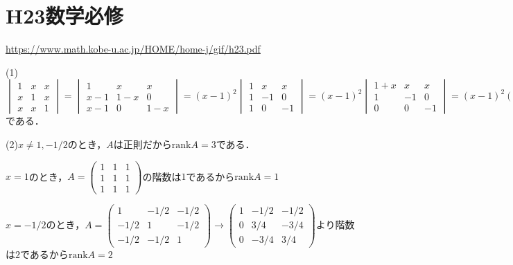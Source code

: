 \documentclass[
		book,
		head_space=20mm,
		foot_space=20mm,
		gutter=10mm,
		line_length=190mm
]{jlreq}
\begin{document}
\section{H23数学必修}
\url{https://www.math.kobe-u.ac.jp/HOME/home-j/gif/h23.pdf}

(1)$\begin{vmatrix}
    1 & x & x \\
    x & 1 & x \\
    x & x & 1
\end{vmatrix}=\begin{vmatrix}
    1 & x & x \\
    x-1 & 1-x & 0 \\
    x-1 & 0 & 1-x
\end{vmatrix}=(x-1)^2\begin{vmatrix}
    1 & x & x \\
    1 & -1 & 0 \\
    1 & 0 & -1
    \end{vmatrix}=(x-1)^2\begin{vmatrix}
        1+x & x & x \\
        1 & -1 & 0 \\
        0 & 0 & -1
        \end{vmatrix}=(x-1)^2(-1)\begin{vmatrix}
            1+x & x \\
            1 & -1
        \end{vmatrix}=-(x-1)^2(-x-1-x)=(x-1)^2(2x+1)$である．

(2)$x\neq 1,-1/2$のとき，$A$は正則だから$\mathrm{rank} A=3$である．

$x=1$のとき，$A=\begin{pmatrix}
    1 & 1 & 1 \\
    1 & 1 & 1 \\
    1 & 1 & 1
\end{pmatrix}$の階数は$1$であるから$ \mathrm{rank} A=1$

$x=-1/2$のとき，$A=\begin{pmatrix}
    1 & -1/2 & -1/2 \\
    -1/2 & 1 & -1/2 \\
    -1/2 & -1/2 & 1
    \end{pmatrix}\rightarrow \begin{pmatrix}
        1 & -1/2 & -1/2 \\
        0 & 3/4 & -3/4 \\
        0 & -3/4 & 3/4
        \end{pmatrix}$より階数は$2$であるから$\mathrm{rank} A=2$
\end{document}
